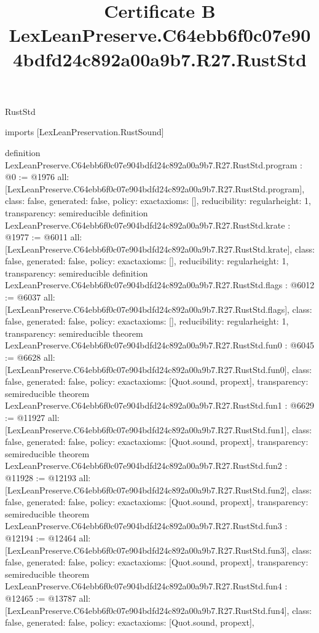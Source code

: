 \begin{lexlean}{RustStd}
\title{Certificate B LexLeanPreserve.C64ebb6f0c07e904bdfd24c892a00a9b7.R27.RustStd}
\begin{coremodule}
imports [LexLeanPreservation.RustSound]

definition LexLeanPreserve.C64ebb6f0c07e904bdfd24c892a00a9b7.R27.RustStd.program : @0 := @1976 {
  all: [LexLeanPreserve.C64ebb6f0c07e904bdfd24c892a00a9b7.R27.RustStd.program],
  class: false,
  generated: false,
  policy: exact{axioms: []},
  reducibility: regular{height: 1},
  transparency: semireducible
}
definition LexLeanPreserve.C64ebb6f0c07e904bdfd24c892a00a9b7.R27.RustStd.krate : @1977 := @6011 {
  all: [LexLeanPreserve.C64ebb6f0c07e904bdfd24c892a00a9b7.R27.RustStd.krate],
  class: false,
  generated: false,
  policy: exact{axioms: []},
  reducibility: regular{height: 1},
  transparency: semireducible
}
definition LexLeanPreserve.C64ebb6f0c07e904bdfd24c892a00a9b7.R27.RustStd.flags : @6012 := @6037 {
  all: [LexLeanPreserve.C64ebb6f0c07e904bdfd24c892a00a9b7.R27.RustStd.flags],
  class: false,
  generated: false,
  policy: exact{axioms: []},
  reducibility: regular{height: 1},
  transparency: semireducible
}
theorem LexLeanPreserve.C64ebb6f0c07e904bdfd24c892a00a9b7.R27.RustStd.fun0 : @6045 := @6628 {
  all: [LexLeanPreserve.C64ebb6f0c07e904bdfd24c892a00a9b7.R27.RustStd.fun0],
  class: false,
  generated: false,
  policy: exact{axioms: [Quot.sound, propext]},
  transparency: semireducible
}
theorem LexLeanPreserve.C64ebb6f0c07e904bdfd24c892a00a9b7.R27.RustStd.fun1 : @6629 := @11927 {
  all: [LexLeanPreserve.C64ebb6f0c07e904bdfd24c892a00a9b7.R27.RustStd.fun1],
  class: false,
  generated: false,
  policy: exact{axioms: [Quot.sound, propext]},
  transparency: semireducible
}
theorem LexLeanPreserve.C64ebb6f0c07e904bdfd24c892a00a9b7.R27.RustStd.fun2 : @11928 := @12193 {
  all: [LexLeanPreserve.C64ebb6f0c07e904bdfd24c892a00a9b7.R27.RustStd.fun2],
  class: false,
  generated: false,
  policy: exact{axioms: [Quot.sound, propext]},
  transparency: semireducible
}
theorem LexLeanPreserve.C64ebb6f0c07e904bdfd24c892a00a9b7.R27.RustStd.fun3 : @12194 := @12464 {
  all: [LexLeanPreserve.C64ebb6f0c07e904bdfd24c892a00a9b7.R27.RustStd.fun3],
  class: false,
  generated: false,
  policy: exact{axioms: [Quot.sound, propext]},
  transparency: semireducible
}
theorem LexLeanPreserve.C64ebb6f0c07e904bdfd24c892a00a9b7.R27.RustStd.fun4 : @12465 := @13787 {
  all: [LexLeanPreserve.C64ebb6f0c07e904bdfd24c892a00a9b7.R27.RustStd.fun4],
  class: false,
  generated: false,
  policy: exact{axioms: [Quot.sound, propext]},
}
\end{coremodule}
\end{lexlean}
